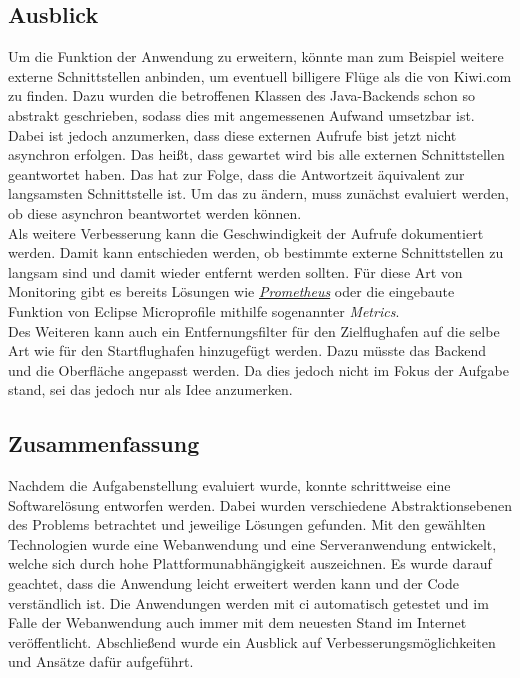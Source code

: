 \documentclass[12pt,twoside,a4paper]{article}
\begin{document}
\begin{sloppypar}
\subsection{Ausblick}
Um die Funktion der Anwendung zu erweitern, könnte man zum Beispiel weitere externe Schnittstellen anbinden, um eventuell billigere Flüge als die von Kiwi.com zu finden. Dazu wurden die betroffenen Klassen des Java-Backends schon so abstrakt geschrieben, sodass dies mit angemessenen Aufwand umsetzbar ist.\\
Dabei ist jedoch anzumerken, dass diese externen Aufrufe bist jetzt nicht asynchron erfolgen. Das heißt, dass gewartet wird bis alle externen Schnittstellen geantwortet haben. Das hat zur Folge, dass die Antwortzeit äquivalent zur langsamsten Schnittstelle ist. Um das zu ändern, muss zunächst evaluiert werden, ob diese asynchron beantwortet werden können.\\
Als weitere Verbesserung kann die Geschwindigkeit der Aufrufe dokumentiert werden. Damit kann entschieden werden, ob bestimmte externe Schnittstellen zu langsam sind und damit wieder entfernt werden sollten. Für diese Art von Monitoring gibt es bereits Lösungen wie \href{https://prometheus.io/}{\textit{Prometheus}} oder die eingebaute Funktion von Eclipse Microprofile mithilfe sogenannter \textit{Metrics}.\\
Des Weiteren kann auch ein Entfernungsfilter für den Zielflughafen auf die selbe Art wie für den Startflughafen hinzugefügt werden. Dazu müsste das Backend und die Oberfläche angepasst werden. Da dies jedoch nicht im Fokus der Aufgabe stand, sei das jedoch nur als Idee anzumerken.
\subsection{Zusammenfassung}
Nachdem die Aufgabenstellung evaluiert wurde, konnte schrittweise eine Softwarelösung entworfen werden. Dabei wurden verschiedene Abstraktionsebenen des Problems betrachtet und jeweilige Lösungen gefunden. Mit den gewählten Technologien wurde eine Webanwendung und eine Serveranwendung entwickelt, welche sich durch hohe Plattformunabhängigkeit auszeichnen. Es wurde darauf geachtet, dass die Anwendung leicht erweitert werden kann und der Code verständlich ist. Die Anwendungen werden mit \acrfull{ci} automatisch getestet und im Falle der Webanwendung auch immer mit dem neuesten Stand im Internet veröffentlicht. Abschließend wurde ein Ausblick auf Verbesserungsmöglichkeiten und Ansätze dafür aufgeführt.
\end{sloppypar}
\newpage


\end{document}
